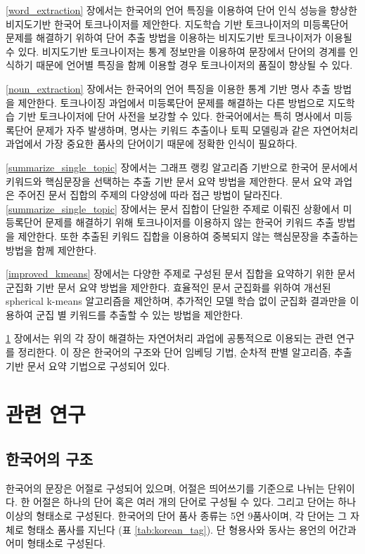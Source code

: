 \documentclass[11pt]{article}
\begin{document}
\ref{word_extraction} 장에서는 한국어의 언어 특징을 이용하여 단어 인식 성능을 향상한 비지도기반 한국어 토크나이저를 제안한다.
지도학습 기반 토크나이저의 미등록단어 문제를 해결하기 위하여 단어 추출 방법을 이용하는 비지도기반  토크나이저가 이용될 수 있다.
비지도기반 토크나이저는 통계 정보만을 이용하여 문장에서 단어의 경계를 인식하기 때문에 언어별 특징을 함께 이용할 경우 토크나이저의 품질이 향상될 수 있다.

\ref{noun_extraction} 장에서는 한국어의 언어 특징을 이용한 통계 기반 명사 추출 방법을 제안한다.
토크나이징 과업에서 미등록단어 문제를 해결하는 다른 방법으로 지도학습 기반 토크나이저에 단어 사전을 보강할 수 있다.
한국어에서는 특히 명사에서 미등록단어 문제가 자주 발생하며, 명사는 키워드 추출이나 토픽 모델링과 같은 자연어처리 과업에서 가장 중요한 품사의 단어이기 때문에 정확한 인식이 필요하다.

\ref{summarize_single_topic} 장에서는 그래프 랭킹 알고리즘 기반으로 한국어 문서에서 키워드와 핵심문장을 선택하는 추출 기반 문서 요약 방법을 제안한다.
문서 요약 과업은 주어진 문서 집합의 주제의 다양성에 따라 접근 방법이 달라진다.
\ref{summarize_single_topic} 장에서는 문서 집합이 단일한 주제로 이뤄진 상황에서 미등록단어 문제를 해결하기 위해 토크나이저를 이용하지 않는 한국어 키워드 추출 방법을 제안한다.
또한 추출된 키워드 집합을 이용하여 중복되지 않는 핵심문장을 추출하는 방법을 함께 제안한다.

\ref{improved_kmeans} 장에서는 다양한 주제로 구성된 문서 집합을 요약하기 위한 문서 군집화 기반 문서 요약 방법을 제안한다.
효율적인 문서 군집화를 위하여 개선된 spherical k-means 알고리즘을 제안하며, 추가적인 모델 학습 없이 군집화 결과만을 이용하여 군집 별 키워드를 추출할 수 있는 방법을 제안한다.

\ref{related_works} 장에서는 위의 각 장이 해결하는 자연어처리 과업에 공통적으로 이용되는 관련 연구를 정리한다.
이 장은 한국어의 구조와 단어 임베딩 기법, 순차적 판별 알고리즘, 추출 기반 문서 요약 기법으로 구성되어 있다.

\newpage
\section{관련 연구} \label{related_works}

\subsection{한국어의 구조}

한국어의 문장은 어절로 구성되어 있으며, 어절은 띄어쓰기를 기준으로 나뉘는 단위이다.
한 어절은 하나의 단어 혹은 여러 개의 단어로 구성될 수 있다.
그리고 단어는 하나 이상의 형태소로 구성된다.
한국어의 단어 품사 종류는 5언 9품사이며, 각 단어는 그 자체로 형태소 품사를 지닌다 (표 \ref{tab:korean_tag}).
단 형용사와 동사는 용언의 어간과 어미 형태소로 구성된다.
\end{document}
